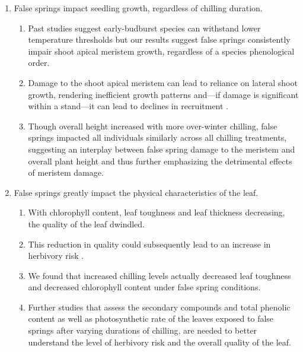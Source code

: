 \documentclass{article}\usepackage[]{graphicx}\usepackage[]{color}
\begin{document}
\begin{enumerate}
\item False springs impact seedling growth, regardless of chilling duration.
  \begin{enumerate}
  \item Past studies suggest early-budburst species can withstand lower temperature thresholds \citep{Lenz2013, Muffler2016, Zohner2020} but our results suggest false springs consistently impair shoot apical meristem growth, regardless of a species phenological order. %
  \item Damage to the shoot apical meristem can lead to reliance on lateral shoot growth, rendering inefficient growth patterns and---if damage is significant within a stand---it can lead to declines in recruitment \citep{Rhodes2018}. 
  \item Though overall height increased with more over-winter chilling, false springs impacted all individuals similarly across all chilling treatments, suggesting an interplay between false spring damage to the meristem and overall plant height and thus further emphasizing the detrimental effects of meristem damage. 
  \end{enumerate}
  
\item False springs greatly impact the physical characteristics of the leaf.
  \begin{enumerate}
  \item With chlorophyll content, leaf toughness and leaf thickness decreasing, the quality of the leaf dwindled.
  \item This reduction in quality could subsequently lead to an increase in herbivory risk \citep{Onoda2011}.
  \item We found that increased chilling levels actually decreased leaf toughness and decreased chlorophyll content under false spring conditions.
  \item Further studies that assess the secondary compounds and total phenolic content \citep{Ayres1993, Webber2016} as well as photosynthetic rate of the leaves exposed to false springs after varying durations of chilling, are needed to better understand the level of herbivory risk and the overall quality of the leaf.
  \end{enumerate}


\end{enumerate}
\end{document}
